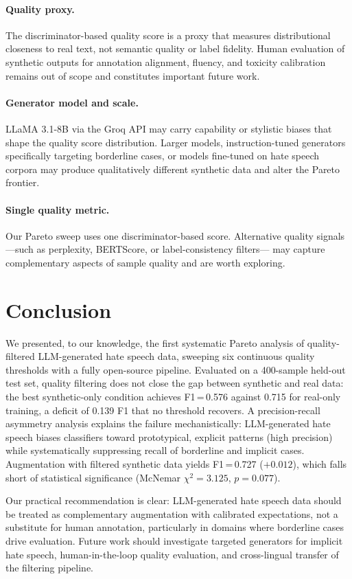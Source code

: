 \documentclass[11pt]{article}
\begin{document}
\paragraph{Quality proxy.}
The discriminator-based quality score is a proxy that measures distributional
closeness to real text, not semantic quality or label fidelity.
Human evaluation of synthetic outputs for annotation alignment, fluency, and
toxicity calibration remains out of scope and constitutes important future work.

\paragraph{Generator model and scale.}
LLaMA 3.1-8B via the Groq API may carry capability or stylistic biases
that shape the quality score distribution.
Larger models, instruction-tuned generators specifically targeting borderline cases,
or models fine-tuned on hate speech corpora may produce qualitatively different
synthetic data and alter the Pareto frontier.

\paragraph{Single quality metric.}
Our Pareto sweep uses one discriminator-based score.
Alternative quality signals—such as perplexity, BERTScore, or label-consistency filters—
may capture complementary aspects of sample quality and are worth exploring.

\section{Conclusion}
\label{sec:conclusion}

We presented, to our knowledge, the first systematic Pareto analysis of quality-filtered LLM-generated
hate speech data, sweeping six continuous quality thresholds with a fully open-source pipeline.
Evaluated on a 400-sample held-out test set, quality filtering does not close the gap
between synthetic and real data: the best synthetic-only condition achieves F1\,=\,0.576
against 0.715 for real-only training, a deficit of 0.139 F1 that no threshold recovers.
A precision-recall asymmetry analysis explains the failure mechanistically:
LLM-generated hate speech biases classifiers toward prototypical, explicit patterns
(high precision) while systematically suppressing recall of borderline and implicit cases.
Augmentation with filtered synthetic data yields F1\,=\,0.727 ($+0.012$), which
falls short of statistical significance (McNemar $\chi^2 = 3.125$, $p = 0.077$).

Our practical recommendation is clear: LLM-generated hate speech data should be treated
as complementary augmentation with calibrated expectations, not a substitute
for human annotation, particularly in domains where borderline cases drive evaluation.
Future work should investigate targeted generators for implicit hate speech,
human-in-the-loop quality evaluation, and cross-lingual transfer of the filtering pipeline.



\end{document}
